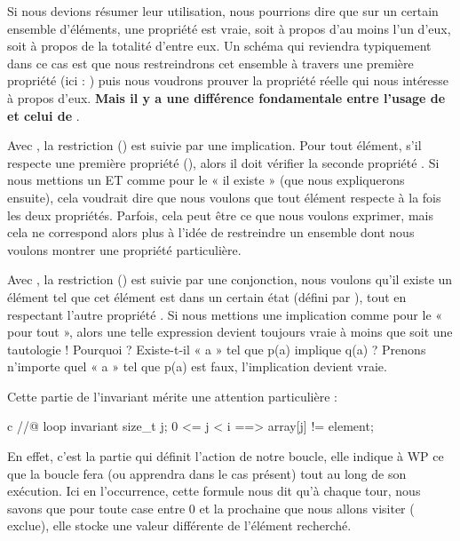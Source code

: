 Si nous devions résumer leur utilisation, nous pourrions dire que sur un certain
ensemble d'éléments, une propriété est vraie, soit à propos d'au moins l'un
d'eux, soit à propos de la totalité d'entre eux. Un schéma qui reviendra 
typiquement dans ce cas est que nous restreindrons cet ensemble à travers une
première propriété (ici : ) puis nous voudrons prouver la
propriété réelle qui nous intéresse à propos d'eux. \textbf{Mais il y a une 
différence fondamentale entre l'usage de  et celui de }.



Avec , la restriction () est suivie
par une implication. Pour tout élément, s'il respecte une première propriété 
(), alors il doit vérifier la seconde propriété . Si nous mettions un ET
comme pour le « il existe » (que nous expliquerons ensuite), cela voudrait dire que 
nous voulons que tout élément respecte à la fois les deux propriétés. Parfois, 
cela peut être ce que nous voulons exprimer, mais cela ne correspond alors plus 
à l'idée de restreindre un ensemble dont nous voulons montrer une propriété 
particulière.



Avec , la restriction () est suivie
par une conjonction, nous voulons qu'il existe un élément tel que cet élément 
est dans un certain état (défini par ), tout en respectant l'autre 
propriété . Si nous mettions une implication comme pour le « pour tout », 
alors une telle expression devient toujours vraie à moins que  soit une 
tautologie ! Pourquoi ? Existe-t-il « a » tel que p(a) implique q(a) ? Prenons 
n'importe quel « a » tel que p(a) est faux, l'implication devient vraie.



Cette partie de l'invariant mérite une attention particulière :



\begin{CodeBlock}{c}
//@ loop invariant \forall size_t j; 0 <= j < i ==> array[j] != element;
\end{CodeBlock}



En effet, c'est la partie qui définit l'action de notre boucle, elle indique à
WP ce que la boucle fera (ou apprendra dans le cas présent) tout au long de
son exécution. Ici en l'occurrence, cette formule nous dit qu'à chaque tour,
nous savons que pour toute case entre 0 et la prochaine que nous allons visiter
( exclue), elle stocke une valeur différente de l'élément
recherché.



